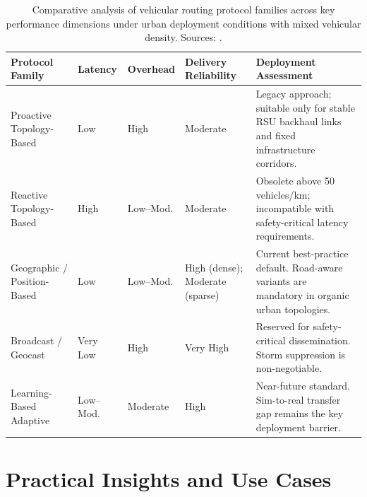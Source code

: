 \documentclass[12pt]{article}
\begin{document}
\begingroup
\renewcommand{\arraystretch}{1.5}
\begin{table}[H]
	\centering
	\caption{Comparative analysis of vehicular routing protocol families across key
	         performance dimensions under urban deployment conditions with mixed
	         vehicular density.
	         Sources: \cite{li2007routing,boukerche2011routing,karp2000gpsr,wang2020deep}.}
	\label{tab:comparison}
	\begin{tabular}{|>{\hyphenpenalty=10000\exhyphenpenalty=10000\raggedright\arraybackslash}p{3.2cm}|>{\hyphenpenalty=10000\exhyphenpenalty=10000\raggedright\arraybackslash}p{1.6cm}|>{\hyphenpenalty=10000\exhyphenpenalty=10000\raggedright\arraybackslash}p{1.8cm}|>{\hyphenpenalty=10000\exhyphenpenalty=10000\raggedright\arraybackslash}p{2.8cm}|>{\raggedright\arraybackslash}p{4.2cm}|}
		\hline
		\textbf{Protocol Family} &
		\textbf{Latency} &
		\textbf{Overhead} &
		\textbf{Delivery Reliability} &
		\textbf{Deployment Assessment} \\
		\hline
		Proactive Topology-Based
		    & Low & High & Moderate &
		    Legacy approach; suitable only for stable RSU backhaul links and fixed
		    infrastructure corridors. \\[4pt]
		\hline
		Reactive Topology-Based
		    & High & Low--Mod. & Moderate &
		    Obsolete above 50 vehicles/km; incompatible with safety-critical latency
		    requirements. \\[4pt]
		\hline
		Geographic / Position-Based
		    & Low & Low--Mod. & High (dense); Moderate (sparse) &
		    Current best-practice default. Road-aware variants are mandatory in
		    organic urban topologies. \\[4pt]
		\hline
		Broadcast / Geocast
		    & Very Low & High & Very High &
		    Reserved for safety-critical dissemination. Storm suppression is
		    non-negotiable. \\[4pt]
		\hline
		Learning-Based Adaptive
		    & Low--Mod. & Moderate & High &
		    Near-future standard. Sim-to-real transfer gap remains the key
		    deployment barrier. \\[4pt]
		\hline
	\end{tabular}
\end{table}
\endgroup


\section{Practical Insights and Use Cases}
\end{document}
